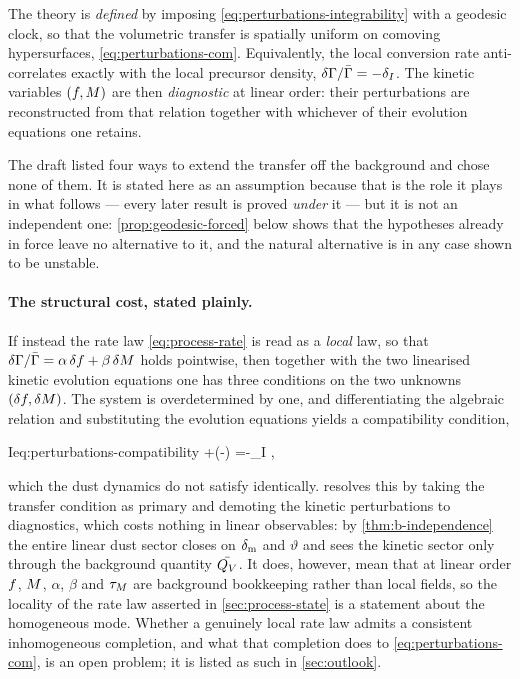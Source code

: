 \begin{assumption}\label{asm:geodesic}
  The theory is \emph{defined} by imposing
  \cref{eq:perturbations-integrability} with a geodesic clock, so that the
  volumetric transfer is spatially uniform on comoving hypersurfaces,
  \cref{eq:perturbations-com}. Equivalently, the local conversion rate
  anti-correlates exactly with the local precursor density,
  $\delta\Gamma/\bar{\Gamma}=-\delta_I$. The kinetic variables $(f,M)$ are
  then \emph{diagnostic} at linear order: their perturbations are reconstructed
  from that relation together with whichever of their evolution equations one
  retains.
\end{assumption}

The draft listed four ways to extend the transfer off the background and chose
none of them. It is stated here as an assumption because that is the role it
plays in what follows --- every later result is proved \emph{under} it --- but
it is not an independent one: \cref{prop:geodesic-forced} below shows that the
hypotheses already in force leave no alternative to it, and the natural
alternative is in any case shown to be unstable.

\paragraph{The structural cost, stated plainly.} If instead the rate law
\cref{eq:process-rate} is read as a \emph{local} law, so that
$\delta\Gamma/\bar{\Gamma}=\alpha\,\delta f+\beta\,\delta M$ holds
pointwise, then together with the two linearised kinetic evolution equations
one has three conditions on the two unknowns $(\delta f,\delta M)$.
The system is overdetermined by one, and differentiating the algebraic relation
and substituting the evolution equations yields a compatibility condition,
%
\begin{keyresult}{I}{eq:perturbations-compatibility}
  \alpha{}
  +\frac{\beta}{\tauM}\left(\delta \fconv-\delta \Mmem\right)
  =-\dot\delta_I ,
\end{keyresult}
%
which the dust dynamics do not satisfy identically. 
resolves this by taking the transfer condition as primary and demoting the
kinetic perturbations to diagnostics, which costs nothing in linear
observables: by \cref{thm:b-independence} the entire linear dust sector closes
on $\delta_{\rm m}$ and $\vartheta$ and sees the kinetic sector only through
the background quantity $\bar {Q_{V}}$. It does, however, mean that at linear order
$f$, $M$, $\alpha$, $\beta$ and $\tau_{M}$ are background bookkeeping
rather than local fields, so the locality of the rate law asserted in
\cref{sec:process-state} is a statement about the homogeneous mode. Whether a
genuinely local rate law admits a consistent inhomogeneous completion, and what
that completion does to \cref{eq:perturbations-com}, is an open problem; it is
listed as such in \cref{sec:outlook}.

